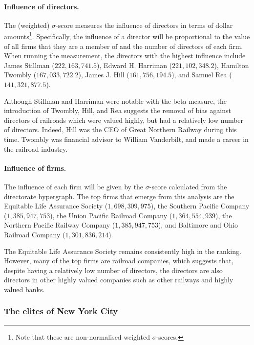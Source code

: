 \documentclass[11pt,fleqn]{article}
\begin{document}
\paragraph{Influence of directors.}

The (weighted) $\sigma$-score measures the influence of directors in terms of dollar amounts\footnote{Note that these are non-normalised weighted $\sigma$-scores.}. Specifically, the influence of a director will be proportional to the value of all firms that they are a member of and the number of directors of each firm. When running the measurement, the directors with the highest influence include James Stillman ($222,163,741.5$), Edward H. Harriman ($221,102,348.2$), Hamilton Twombly ($167,033,722.2$), James J. Hill ($161,756,194.5$), and Samuel Rea ($141,321,877.5$).

Although Stillman and Harriman were notable with the beta measure, the introduction of Twombly, Hill, and Rea suggests the removal of bias against directors of railroads which were valued highly, but had a relatively low number of directors. Indeed, Hill was the CEO of Great Northern Railway during this time. Twombly was financial advisor to William Vanderbilt, and made a career in the railroad industry.

\paragraph{Influence of firms.}

The influence of each firm will be given by the $\sigma$-score calculated from the directorate hypergraph. The top firms that emerge from this analysis are the Equitable Life Assurance Society ($1,698,309,975$), the Southern Pacific Company ($1,385,947,753$), the Union Pacific Railroad Company ($1,364,554,939$), the Northern Pacific Railway Company ($1,385,947,753$), and Baltimore and Ohio Railroad Company ($1,301,836,214$).

The Equitable Life Assurance Society remains consistently high in the ranking. However, many of the top firms are railroad companies, which suggests that, despite having a relatively low number of directors, the directors are also directors in other highly valued companies such as other railways and highly valued banks.

\subsubsection*{The elites of New York City}
\end{document}
